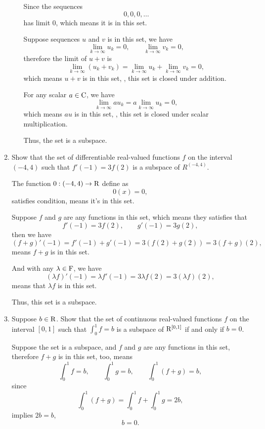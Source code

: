 \begin{enumerate}
\begin{solution}
\begin{enumerate}[label=(\alph*)]
                    Since the sequences 
                    \[ 0, 0, 0, \ldots \]
                    has limit $0$, which means it is in this set. 

                    Suppose sequences $u$ and $v$ is in this set, we have 
                    \[ \lim_{k\to \infty} u_k = 0, \qquad \lim_{k \to \infty} v_k = 0,\]
                    therefore the limit of $u + v$ is 
                    \[ \lim_{k \to \infty} (u_k + v_k) = \lim_{k\to \infty} u_k + \lim_{k\to \infty} v_k = 0,\]
                    which means $u + v$ is in this set, \ie, this set is closed under addition.

                    For any scalar $a \in \mathrm{C}$, we have 
                    \[ \lim_{k \to \infty} au_k = a\lim_{k \to \infty} u_k = 0,\]
                    which means $au$ is in this set, \ie, this set is closed under scalar multiplication.

                    Thus, the set is a subspace.
            \end{enumerate}
        \end{solution}
    \item Show that the set of differentiable real-valued functions $f$ on the interval $(-4,4)$ such 
        that $f'(-1)=3f(2)$ is a subspace of $R^{(-4,4)}$.
        \begin{solution}
            The function $0: (-4,4) \to \mathrm{R}$ define as 
            \[ 0(x) = 0, \]
            satisfies condition, means it's in this set.

            Suppose $f$ and $g$ are any functions in this set, which means they satisfies that 
            \[ f'(-1) = 3f(2), \qquad g'(-1) =3g(2),\]
            then we have 
            \[ (f+g)'(-1) = f'(-1) + g'(-1) = 3(f(2)+g(2)) = 3(f+g)(2),\]
            means $f + g$ is in this set.

            And with any $\lambda \in \mathrm{F}$, we have 
            \[ (\lambda f)'(-1) = \lambda f'(-1) = 3\lambda f(2) = 3(\lambda f)(2),\]
            means that $\lambda f$ is in this set.

            Thus, this set is a subspace.
        \end{solution}
    \item Suppose $b \in \mathrm{R}$. Show that the set of continuous real-valued functions $f$ on the interval 
        $[0,1]$ such that $\int_0^{1} f = b$ is a subspace of $\mathrm{R}^{[0,1]}$ if and only if $b=0$.
        \begin{solution}
            Suppose the set is a subspace, and $f$ and $g$ are any functions in this set, therefore $f+g$ is in this set, too, means 
            \[ \int_0^1 f = b,\qquad \int_0^1 g = b,\qquad \int_0^1 (f+g) = b,\]
            since 
            \[ \int_0^1 (f+g) = \int_0^1 f + \int_0^1 g = 2b,\]
            implies $2b = b$, \ie 
            \[ b = 0.\]
            

\end{solution}
\end{enumerate}
